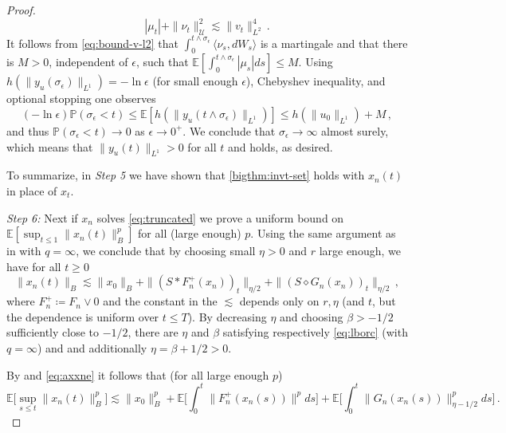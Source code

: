 \documentclass[final]{amsart}
\numberwithin{thm}{section}
\numberwithin{equation}{section}
\newcommand{\E}{\mathbb{E}}
\newcommand{\U}{\mathcal{U}}
\newcommand{\Prb}{\mathbb{P}}
\newcommand{\ip}[2]{\langle #1, #2 \rangle}
\begin{document}
\begin{proof}
    $$
    |\mu_t| + \|\nu_t\|_\U^2 \lesssim \|v_t\|_{L^2}^4 
     \,.
    $$
     It follows from \eqref{eq:bound-v-l2} that $\int_0^{t\wedge \sigma_\epsilon} \ip{\nu_{s }}{dW_s}$ is a martingale and that there is $M > 0$, independent of $\epsilon$, such that $\E[\int_0^{t\wedge \sigma_\epsilon} |\mu_{s }|ds] \leq M$. Using $h(\|y_u(\sigma_\epsilon)\|_{L^1}) = -\ln \epsilon$ (for small enough $\epsilon$), Chebyshev inequality, and  
    optional stopping one observes
    \begin{equation*}
        (-\ln \epsilon)\Prb(\sigma_\epsilon < t)\leq \E[h(\|y_u(t \wedge \sigma_\epsilon)\|_{L^1})] \leq h(\|u_0\|_{L^1}) + M \,,
    \end{equation*}
    and thus $\Prb(\sigma_\epsilon < t) \to 0$ as $\epsilon \to 0^+$. We conclude that $\sigma_\epsilon \to \infty$ almost surely, which means that $\|y_u(t)\|_{L^1} > 0$ for all $t$ and  holds, as desired.

    To summarize, in \textit{Step 5} we have shown that \ref{bigthm:invt-set} holds with $x_n(t)$ in place of $x_t$.
    
    
    
    
    
    
    
    

\textit{Step 6:}
    Next if $x_n$ solves \eqref{eq:truncated} we prove a uniform bound on $\E[\sup_{t \leq 1} \|x_n(t)\|_B^p]$ for all (large enough) $p$.
    Using the same argument as in  with $q = \infty$, we conclude that by choosing small $\eta > 0$ and $r$ large enough, we have for all $t \geq 0$
    \begin{equation}\label{eq:axxne}
    \|x_n(t)\|_B \lesssim \|x_0\|_B + \|(S * F_n^+(x_n))_t\|_{\eta/2} + \|(S \diamond G_n(x_n))_t\|_{\eta/2} \,,    \end{equation}
    where $F_n^+ \coloneqq F_n \vee 0$ and the constant in the $\lesssim$ depends only on $r,\eta$ (and $t$, but the dependence is uniform over $t \leq T$). By decreasing $\eta$ and choosing $\beta > -1/2$ sufficiently close to $-1/2$,  there are $\eta$ and $\beta$ satisfying respectively \eqref{eq:lborc} (with $q = \infty$) and  and additionally $\eta = \beta + 1/2 > 0$.

    By  and \eqref{eq:axxne} it follows that (for all large enough $p$) 
    $$\E\Big[\sup_{s \leq t} \|x_n(t)\|_B^p\Big] \lesssim \|x_0\|_B^p + \E\Big[\int_0^t \|F_n^+(x_n(s))\|^pds\Big] + \E\Big[\int_0^t \|G_n(x_n(s))\|_{\eta - 1/2}^pds\Big] \,.$$
    

\end{proof}
\end{document}
